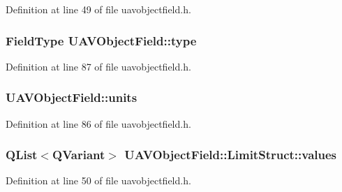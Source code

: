 \-Definition at line 49 of file uavobjectfield.\-h.

\hypertarget{group___u_a_v_objects_plugin_gad84e6c3a333d2c62b5159936e42fb737}{
\subsubsection[{type}]{\setlength{\rightskip}{0pt plus 5cm}\-Field\-Type {\bf \-U\-A\-V\-Object\-Field\-::type}}}\label{group___u_a_v_objects_plugin_gad84e6c3a333d2c62b5159936e42fb737}


\-Definition at line 87 of file uavobjectfield.\-h.

\hypertarget{group___u_a_v_objects_plugin_ga1ecf5fdaab2ac408b67623d5d75368c5}{
\subsubsection[{units}]{ {\bf \-U\-A\-V\-Object\-Field\-::units}}}\label{group___u_a_v_objects_plugin_ga1ecf5fdaab2ac408b67623d5d75368c5}


\-Definition at line 86 of file uavobjectfield.\-h.

\hypertarget{group___u_a_v_objects_plugin_ga27188ffa94eb6c560765dd56b0471561}{
\subsubsection[{values}]{\setlength{\rightskip}{0pt plus 5cm}\-Q\-List$<$\-Q\-Variant$>$ {\bf \-U\-A\-V\-Object\-Field\-::\-Limit\-Struct\-::values}}}\label{group___u_a_v_objects_plugin_ga27188ffa94eb6c560765dd56b0471561}


\-Definition at line 50 of file uavobjectfield.\-h.



